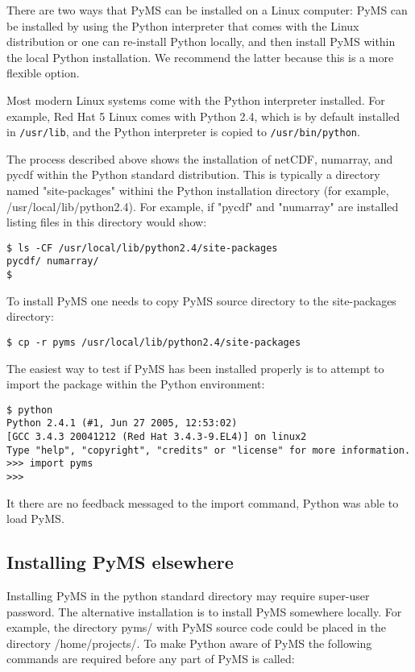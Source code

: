 There are two ways that PyMS can be installed on a Linux computer: PyMS can
be installed by using the Python interpreter that comes with the Linux
distribution or one can re-install Python locally, and then install PyMS
within the local Python installation. We recommend the latter because this
is a more flexible option.

Most modern Linux systems come with the Python interpreter installed. For
example, Red Hat 5 Linux comes with Python 2.4, which is by default
installed in {\tt /usr/lib}, and the Python interpreter is copied to 
{\tt /usr/bin/python}.

The process described above shows the installation of netCDF, numarray,
and pycdf within the Python standard distribution. This is typically
a directory named "site-packages" withini the Python installation
directory (for example, /usr/local/lib/python2.4). For example, if
"pycdf" and "numarray" are installed listing files in this directory
would show:

\begin{verbatim}
$ ls -CF /usr/local/lib/python2.4/site-packages
pycdf/ numarray/
$ 
\end{verbatim}

To install PyMS one needs to copy PyMS source directory to
the site-packages directory:

\begin{verbatim}
$ cp -r pyms /usr/local/lib/python2.4/site-packages
\end{verbatim}

The easiest way to test if PyMS has been installed properly is 
to attempt to import the package within the Python environment:

\begin{verbatim}
$ python
Python 2.4.1 (#1, Jun 27 2005, 12:53:02) 
[GCC 3.4.3 20041212 (Red Hat 3.4.3-9.EL4)] on linux2
Type "help", "copyright", "credits" or "license" for more information.
>>> import pyms
>>>
\end{verbatim}

It there are no feedback messaged to the import command, Python
was able to load PyMS. 

\subsection{Installing PyMS elsewhere}

Installing PyMS in the python standard directory may require
super-user password. The alternative installation is to install
PyMS somewhere locally. For example, the directory pyms/ with
PyMS source code could be placed in the directory /home/projects/.
To make Python aware of PyMS the following commands are required
before any part of PyMS is called:

